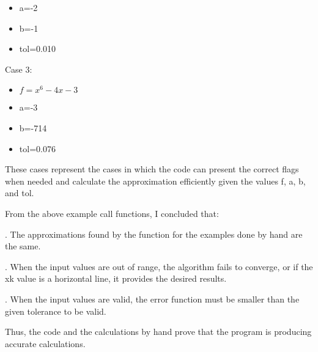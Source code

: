 \documentclass{article}
\begin{document}
{\begin{itemize}
	\item a=-2
    \item b=-1
	\item tol=0.010
\end{itemize}
\par \medskip
Case 3:
\begin{itemize}
    \item $f=x^6-4x-3$
	\item a=-3
    \item b=-714
	\item tol=0.076
\end{itemize}
\par \medskip
These cases represent the cases in which the code can present the correct flags when needed and calculate the approximation efficiently given the values f, a, b, and tol.
\par \medskip
From the above example call functions, I concluded that:
\par {}. The approximations found by the function for the examples done by hand are the same.
\par {}.	When the input values are out of range, the algorithm fails to converge, or if the xk value is a horizontal line, it provides the desired results.
\par {}. When the input values are valid, the error function must be smaller than the given tolerance to be valid.
\par \medskip
Thus, the code and the calculations by hand prove that the program is producing accurate calculations.

}


\end{document}
